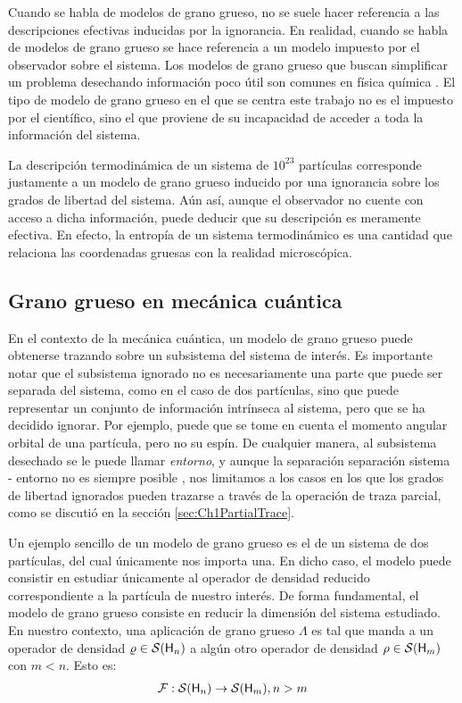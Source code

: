 Cuando se habla de modelos de grano grueso, no se suele hacer referencia a las descripciones efectivas inducidas por la ignorancia. En realidad, cuando se habla de modelos de grano grueso se hace referencia a un modelo impuesto por el observador sobre el sistema. Los modelos de grano grueso que buscan simplificar un problema desechando información poco útil son comunes en física química \cite{PhysChemI,PhysChemII,PhysChemIII}. El tipo de modelo de grano grueso en el que se centra este trabajo no es el impuesto por el científico, sino el que proviene de su incapacidad de acceder a toda la información del sistema.

La descripción termodinámica de un sistema de $10^{23}$ partículas corresponde justamente a un modelo de grano grueso inducido por una ignorancia sobre los grados de libertad del sistema. Aún así, aunque el observador no cuente con acceso a dicha información, puede deducir que su descripción es meramente efectiva. En efecto, la entropía de un sistema termodinámico es una cantidad que relaciona las coordenadas gruesas con la realidad microscópica.

\subsection{Grano grueso en mecánica cuántica}

En el contexto de la mecánica cuántica, un modelo de grano grueso puede obtenerse trazando sobre un subsistema del sistema de interés. Es importante notar que el subsistema ignorado no es necesariamente una parte que puede ser separada del sistema, como en el caso de dos partículas, sino que puede representar un conjunto de información intrínseca al sistema, pero que se ha decidido ignorar. Por ejemplo, puede que se tome en cuenta el momento angular orbital de una partícula, pero no su espín. De cualquier manera, al subsistema desechado se le puede llamar \textit{entorno}, y aunque la separación separación sistema - entorno no es siempre posible \cite{Macro-To-Micro}, nos limitamos a los casos en los que los grados de libertad ignorados pueden trazarse a través de la operación de traza parcial, como se discutió en la sección \ref{sec:Ch1PartialTrace}.

Un ejemplo sencillo de un modelo de grano grueso es el de un sistema de dos partículas, del cual únicamente nos importa una. En dicho caso, el modelo puede consistir en estudiar únicamente al operador de densidad reducido correspondiente a la partícula de nuestro interés. De forma fundamental, el modelo de grano grueso consiste en reducir la dimensión del sistema estudiado. En nuestro contexto, una aplicación de grano grueso $\Lambda$ es tal que manda a un operador de densidad $\varrho\in\mathcal{S}({\sf H}_{n})$ a algún otro operador de densidad $\rho\in\mathcal{S}({\sf H}_{m})$ con $m<n$. Esto es:
\begin{align*}
    \mathcal{F}:\mathcal{S}({\sf H}_{n})\to \mathcal{S}({\sf H}_{m}), n>m
\end{align*}